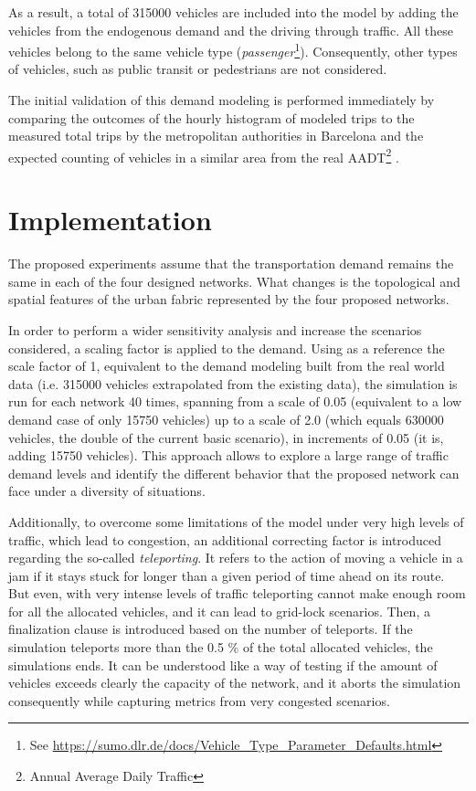 \documentclass[11pt]{article}
\begin{document}
As a result, a total of 315000 vehicles are included into the model by adding the vehicles from the endogenous demand and the driving through traffic. All these vehicles belong to the same vehicle type (\textit{passenger}\footnote{See \url{https://sumo.dlr.de/docs/Vehicle_Type_Parameter_Defaults.html}}). Consequently, other types of vehicles, such as public transit or pedestrians are not considered.

The initial validation of this demand modeling is performed immediately by comparing the outcomes of the hourly histogram of modeled trips to the measured total trips by the metropolitan authorities in Barcelona \citep{AreadeBarcelona.AutoritatdelTransportMetropolita2020} and the expected counting of vehicles in a similar area from the real AADT\footnote{Annual Average Daily Traffic} \citep{AjuntamentdeBarcelona2016}.

\section{Implementation}

The proposed experiments assume that the transportation demand remains the same in each of the four designed networks. What changes is the topological and spatial features of the urban fabric represented by the four proposed networks. 

In order to perform a wider sensitivity analysis and increase the scenarios considered, a scaling factor is applied to the demand. Using as a reference the scale factor of 1, equivalent to the demand modeling built from the real world data (i.e. 315000 vehicles extrapolated from the existing data), the simulation is run for each network 40 times, spanning from a scale of 0.05 (equivalent to a low demand case of only 15750 vehicles) up to a scale of 2.0 (which equals 630000 vehicles, the double of the current basic scenario), in increments of 0.05 (it is, adding 15750 vehicles). This approach allows to explore a large range of traffic demand levels and identify the different behavior that the proposed network can face under a diversity of situations.

Additionally, to overcome some limitations of the model under very high levels of traffic, which lead to congestion, an additional correcting factor is introduced regarding the so-called \textit{teleporting}. It refers to the action of moving a vehicle in a jam if it stays stuck for longer than a given period of time ahead on its route. But even, with very intense levels of traffic teleporting cannot make enough room for all the allocated vehicles, and it can lead to grid-lock scenarios. Then, a finalization clause is introduced based on the number of teleports. If the simulation teleports more than the 0.5 \% of the total allocated vehicles, the simulations ends. It can be understood like a way of testing if the amount of vehicles exceeds clearly the capacity of the network, and it aborts the simulation consequently while capturing metrics from very congested scenarios.
\end{document}
